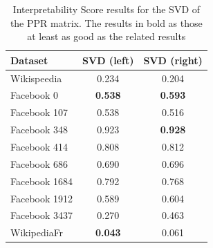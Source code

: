\begin{table}[t]
    \caption[Interpretability Score results for the SVD of the PPR matrix]{Interpretability Score results for the SVD of the PPR matrix. The results in bold as those at least as good as the related \parfaite{} results}
    \begin{center}
        \begin{tabular}{l|c|c}
            \hline
            \textbf{Dataset} & \textbf{SVD (left)} & \textbf{SVD (right)}\\
            \hline
Wikispeedia  & 0.234 & 0.204\\
Facebook 0 & \textbf{0.538} & \textbf{0.593}\\
Facebook 107 & 0.538 & 0.516\\
Facebook 348 & 0.923 & \textbf{0.928}\\
Facebook 414 & 0.808 & 0.812\\
Facebook 686 & 0.690 & 0.696\\
Facebook 1684 & 0.792 & 0.768\\
Facebook 1912 & 0.589 & 0.604\\
Facebook 3437 & 0.270 & 0.463\\
WikipediaFr  & \textbf{0.043} & 0.061\\
\hline
        \end{tabular}
    \end{center}
    \label{tab:IS_SVD_scores}
\end{table}

